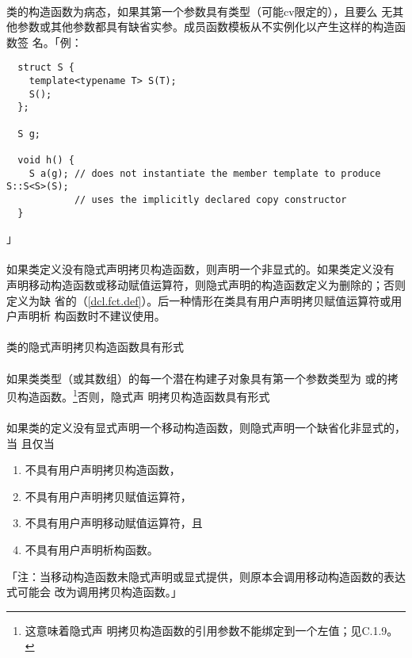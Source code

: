 \paragraph{}
类的构造函数为病态，如果其第一个参数具有类型（可能cv限定的），且要么
无其他参数或其他参数都具有缺省实参。成员函数模板从不实例化以产生这样的构造函数签
名。「例：
\begin{lstlisting}
  struct S {
    template<typename T> S(T);
    S();
  };

  S g;

  void h() {
    S a(g); // does not instantiate the member template to produce S::S<S>(S);
            // uses the implicitly declared copy constructor
  }
\end{lstlisting}」

\paragraph{}
如果类定义没有隐式声明拷贝构造函数，则声明一个非显式的。如果类定义没有
声明移动构造函数或移动赋值运算符，则隐式声明的构造函数定义为删除的；否则定义为缺
省的（\ref{dcl.fct.def}）。后一种情形在类具有用户声明拷贝赋值运算符或用户声明析
构函数时不建议使用。

\paragraph{}
类的隐式声明拷贝构造函数具有形式                                        \\
\mbox{}                                           \\
如果类类型（或其数组）的每一个潜在构建子对象具有第一个参数类型为
或的拷贝构造函数。\footnote{这意味着隐式声
明拷贝构造函数的引用参数不能绑定到一个左值；见C.1.9。}否则，隐式声
明拷贝构造函数具有形式                                                        \\
\mbox{}

\paragraph{}
如果类的定义没有显式声明一个移动构造函数，则隐式声明一个缺省化非显式的，当
且仅当
\begin{enumerate}
  \item{不具有用户声明拷贝构造函数，}
  \item{不具有用户声明拷贝赋值运算符，}
  \item{不具有用户声明移动赋值运算符，且}
  \item{不具有用户声明析构函数。}
\end{enumerate}
「注：当移动构造函数未隐式声明或显式提供，则原本会调用移动构造函数的表达式可能会
改为调用拷贝构造函数。」

